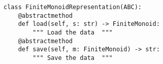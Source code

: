 \par\begin{minipage}{60ex}
\begin{verbatim}
class FiniteMonoidRepresentation(ABC):
    @abstractmethod
    def load(self, s: str) -> FiniteMonoid:
        """ Load the data  """
    @abstractmethod
    def save(self, m: FiniteMonoid) -> str:
        """ Save the data  """
\end{verbatim}
\end{minipage}\par